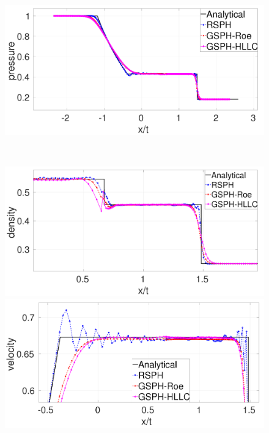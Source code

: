 \documentclass[review]{elsarticle}
\begin{document}
\begin{figure}[H]
\begin{minipage}{.495\textwidth}
    \end{minipage}%
    \begin{minipage}{.495 \textwidth}
        \centering
        \includegraphics[width=0.99 \textwidth,height=0.6\textwidth]{./Figures/RCM-Sod-GSPH-compare-p}
    \end{minipage}%
    \\
    \begin{minipage}{.495\textwidth}
        \centering
        \includegraphics[width=0.99 \textwidth,height=0.6\textwidth]{./Figures/RCM-Sod-GSPH-compare-rho-zoom}
    \end{minipage}%
    \begin{minipage}{.495 \textwidth}
        \centering
        \includegraphics[width=0.99 \textwidth,height=0.6\textwidth]{./Figures/RCM-Sod-GSPH-compare-v-zoom}

\end{minipage}
\end{figure}
\end{document}
